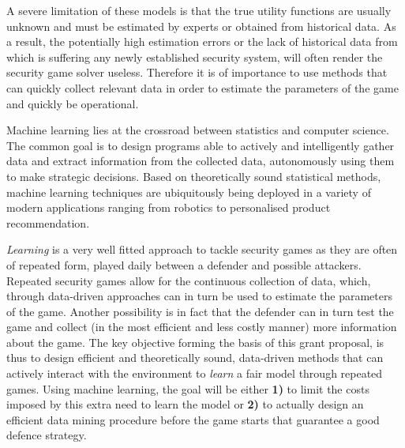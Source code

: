 A severe limitation of these models is that the true utility functions are usually unknown and must be estimated by experts or obtained from historical data. As a result, the potentially high estimation errors or the lack of historical data from which is suffering any newly established security system, will often render the security game solver useless. 
Therefore it is of importance to use methods that can quickly collect relevant data  in order to estimate the parameters of the game and quickly be operational.

Machine learning lies at the crossroad between statistics and computer science. The common goal is to design programs able to actively and intelligently gather data and extract information from the collected data, autonomously using them to make strategic decisions. Based on theoretically sound statistical methods, machine learning techniques are ubiquitously being deployed in a variety of modern applications ranging from robotics to personalised product recommendation. 

 {\em Learning} is a very well fitted approach to tackle security games as they are often of repeated form, played daily between a defender and possible attackers. Repeated security games allow for the continuous collection of data, which, through data-driven approaches can in turn be used to estimate the parameters of the game. Another possibility is in fact that the defender can in turn test the game and collect (in the most efficient and less costly manner) more information about the game. The key objective forming the basis of this grant proposal, is thus to design efficient and theoretically sound, data-driven methods that can actively interact with the environment to {\em learn} a fair model through repeated games. Using machine learning, the goal will be either \textbf{1)} to limit the costs imposed by this extra need to learn the model or  \textbf{2)} to actually design an efficient data mining procedure before the game starts that guarantee a good defence strategy.

